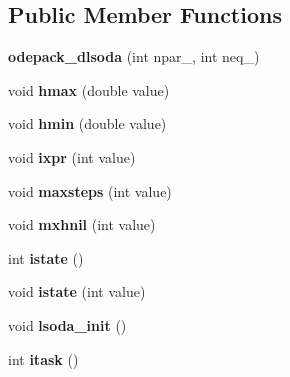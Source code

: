 \subsection*{Public Member Functions}
\begin{DoxyCompactItemize}
\item 
\mbox{\label{classodepack__dlsoda_a843b8ba43e2aff07daec1420cd25566d}} 
{\bfseries odepack\+\_\+dlsoda} (int npar\+\_\+, int neq\+\_\+)
\item 
\mbox{\label{classodepack__dlsoda_ac9ff0de8a49daae6687347d37a57bc8b}} 
void {\bfseries hmax} (double value)
\item 
\mbox{\label{classodepack__dlsoda_a65b0f71801ce0ddd2cae324907f685c3}} 
void {\bfseries hmin} (double value)
\item 
\mbox{\label{classodepack__dlsoda_a36703efaae208e98bc69f4c0f41f09e6}} 
void {\bfseries ixpr} (int value)
\item 
\mbox{\label{classodepack__dlsoda_a4a400ab24bfe3383c5875fd05a1c674a}} 
void {\bfseries maxsteps} (int value)
\item 
\mbox{\label{classodepack__dlsoda_a6daa9e98e630de11df59019dc222c2d2}} 
void {\bfseries mxhnil} (int value)
\item 
\mbox{\label{classodepack__dlsoda_ad22afd38954c315495f4111185081a5d}} 
int {\bfseries istate} ()
\item 
\mbox{\label{classodepack__dlsoda_a3d6e191ab00709e24bb478943065207d}} 
void {\bfseries istate} (int value)
\item 
\mbox{\label{classodepack__dlsoda_a59bd524c172806073e20b056afcc5b2a}} 
void {\bfseries lsoda\+\_\+init} ()
\item 
\mbox{\label{classodepack__dlsoda_a157eeb6db451d1b882a2fbc4753dbccd}} 
int {\bfseries itask} ()
\item 
\mbox{\label{classodepack__dlsoda_a345b08b1b6b65ee8e0736f8225ba9185}} 

\end{DoxyCompactItemize}
